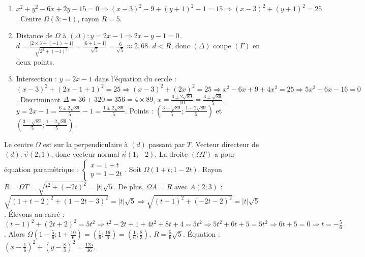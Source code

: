 \begin{enumerate}[label=\alph*)]
    \item $x^2 + y^2 - 6x + 2y - 15 = 0 \Rightarrow (x - 3)^2 - 9 + (y + 1)^2 - 1 = 15 \Rightarrow (x - 3)^2 + (y + 1)^2 = 25$. Centre $\Omega(3; -1)$, rayon $R = 5$.
    \item Distance de $\Omega$ à $(\Delta) : y = 2x - 1 \Rightarrow 2x - y - 1 = 0$. $d = \frac{|2\times3 - (-1) - 1|}{\sqrt{2^2 + (-1)^2}} = \frac{|6 + 1 - 1|}{\sqrt{5}} = \frac{6}{\sqrt{5}} \approx 2,68$. $d < R$, donc $(\Delta)$ coupe $(\Gamma)$ en deux points.
    \item Intersection : $y = 2x - 1$ dans l'équation du cercle : $(x - 3)^2 + (2x - 1 + 1)^2 = 25 \Rightarrow (x - 3)^2 + (2x)^2 = 25 \Rightarrow x^2 - 6x + 9 + 4x^2 = 25 \Rightarrow 5x^2 - 6x - 16 = 0$. Discriminant $\Delta = 36 + 320 = 356 = 4\times89$, $x = \frac{6 \pm 2\sqrt{89}}{10} = \frac{3 \pm \sqrt{89}}{5}$. $y = 2x - 1 = \frac{6 \pm 2\sqrt{89}}{5} - 1 = \frac{1 \pm 2\sqrt{89}}{5}$. Points : $\left(\frac{3 + \sqrt{89}}{5}; \frac{1 + 2\sqrt{89}}{5}\right)$ et $\left(\frac{3 - \sqrt{89}}{5}; \frac{1 - 2\sqrt{89}}{5}\right)$.
\end{enumerate}

Le centre $\Omega$ est sur la perpendiculaire à $(d)$ passant par $T$. Vecteur directeur de $(d) : \vec{v}(2; 1)$, donc vecteur normal $\vec{n}(1; -2)$. La droite $(\Omega T)$ a pour équation paramétrique : $\begin{cases} x = 1 + t \\ y = 1 - 2t \end{cases}$. Soit $\Omega(1 + t; 1 - 2t)$. Rayon $R = \Omega T = \sqrt{t^2 + (-2t)^2} = |t|\sqrt{5}$. De plus, $\Omega A = R$ avec $A(2; 3)$ : $\sqrt{(1 + t - 2)^2 + (1 - 2t - 3)^2} = |t|\sqrt{5} \Rightarrow \sqrt{(t - 1)^2 + (-2t - 2)^2} = |t|\sqrt{5}$. Élevons au carré : $(t - 1)^2 + (2t + 2)^2 = 5t^2 \Rightarrow t^2 - 2t + 1 + 4t^2 + 8t + 4 = 5t^2 \Rightarrow 5t^2 + 6t + 5 = 5t^2 \Rightarrow 6t + 5 = 0 \Rightarrow t = -\frac{5}{6}$. Alors $\Omega\left(1 - \frac{5}{6}; 1 + \frac{10}{6}\right) = \left(\frac{1}{6}; \frac{16}{6}\right) = \left(\frac{1}{6}; \frac{8}{3}\right)$, $R = \frac{5}{6}\sqrt{5}$. Équation : $\left(x - \frac{1}{6}\right)^2 + \left(y - \frac{8}{3}\right)^2 = \frac{125}{36}$.

